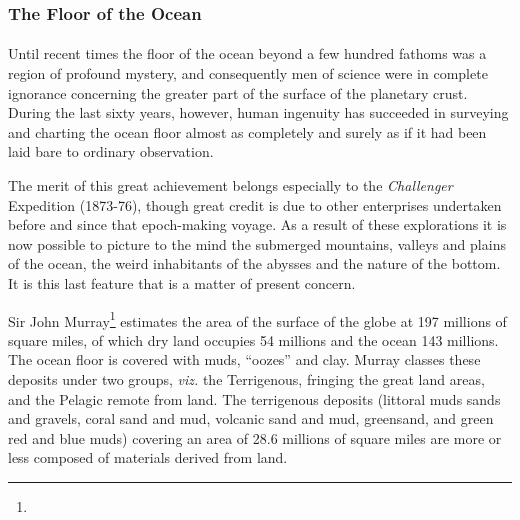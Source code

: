 \documentclass[a4paper, 12pt, oneside]{article}
\begin{document}
\subsubsection{The Floor of the Ocean}
\paragraph{}
Until recent times the floor of the ocean beyond a few hundred fathoms was a region of profound mystery, and consequently men of science were in complete ignorance concerning the greater part of the surface of the planetary crust. During the last sixty years, however, human ingenuity has succeeded in surveying and charting the ocean floor almost as completely and surely as if it had been laid bare to ordinary observation.

The merit of this great achievement belongs especially to the \emph{Challenger} Expedition (1873-76), though great credit is due to other enterprises undertaken before and since that epoch-making voyage. As a result of these explorations it is now possible to picture to the mind the submerged mountains, valleys and plains of the ocean, the weird inhabitants of the abysses and the nature of the bottom. It is this last feature that is a matter of present concern.

Sir John Murray\footnote{} estimates the area of the surface of the globe at 197 millions of square miles, of which dry land occupies 54 millions and the ocean 143 millions. The ocean floor is covered with muds, ``oozes'' and clay. Murray classes these deposits under two groups, \emph{viz.} the Terrigenous, fringing the great land areas, and the Pelagic remote from land. The terrigenous deposits (littoral muds sands and gravels, coral sand and mud, volcanic sand and mud, greensand, and green red and blue muds) covering an area of 28.6 millions of square miles are more or less composed of materials derived from land.
\end{document}
